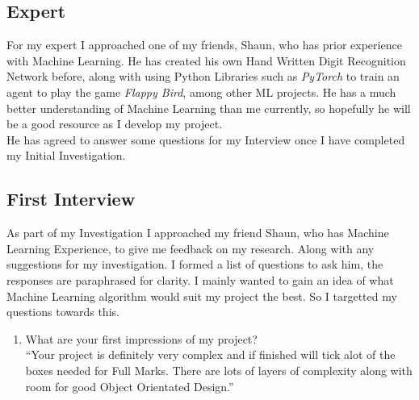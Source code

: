 \begin{flushleft}
        \vspace{1cm}
        \subsection{Expert}
            \vspace{0.2cm}
            For my expert I approached one of my friends, Shaun, who has prior experience with Machine Learning. He has
            created his own Hand Written Digit Recognition Network before, along with using Python Libraries such as 
            \textit{PyTorch} to train an agent to play the game \textit{Flappy Bird}, among other ML projects. He has 
            a much better understanding of Machine Learning than me currently, so hopefully he will be a good resource 
            as I develop my project. \\
            \vspace{0.2cm}
            He has agreed to answer some questions for my Interview once I have completed my Initial Investigation.


        \subsection{First Interview}
            \large
            \vspace{0.2cm}
            As part of my Investigation I approached my friend Shaun, who has Machine Learning Experience, to give me feedback on my
            research. Along with any suggestions for my investigation. I formed a list of questions to ask him, the responses are
            paraphrased for clarity. I mainly wanted to gain an idea of what Machine Learning algorithm would suit my project the best.
            So I targetted my questions towards this.\\
            \vspace{0.2cm}
            \begin{enumerate}
                \item {\large What are your first impressions of my project?} \\
                \vspace{0.2cm}
                “Your project is definitely very complex and if finished will tick alot of the boxes needed for Full Marks. There are lots
                of layers of complexity along with room for good Object Orientated Design.”


\end{enumerate}
\end{flushleft}
